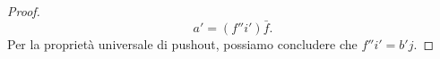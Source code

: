 \begin{proof}
\[    a' = (f''i') \bar{f} .
  \]
  Per la proprietà universale di pushout, possiamo concludere che
  \(f''i' = b'j\).
\end{proof}



